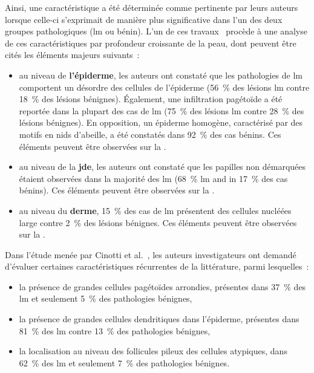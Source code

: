 Ainsi, une caractéristique a été déterminée comme pertinente par leurs auteurs lorsque celle-ci s'exprimait de manière plus significative dans l'un des deux groupes pathologiques (\gls{lm} ou bénin). L'un de ces travaux~\cite{Guitera2010} procède à une analyse de ces caractéristiques par profondeur croissante de la peau, dont peuvent être cités les éléments majeurs suivants~:
\begin{itemize}
    \item au niveau de \textbf{l'épiderme}, les auteurs ont constaté que les pathologies de \gls{lm} comportent un désordre des cellules de l'épiderme (56~\% des lésions \gls{lm} contre 18~\% des lésions bénignes). Également, une infiltration pagétoïde a été reportée dans la plupart des cas de \gls{lm} (75~\% des lésions \gls{lm} contre 28~\% des lésions bénignes). En opposition, un épiderme homogène, caractérisé par des motifs en nids d'abeille, a été constatés dans 92~\% des cas bénins. Ces éléments peuvent être observées sur la .
    \item au niveau de la \textbf{\gls{jde}}, les auteurs ont constaté que les papilles non démarquées étaient observées dans la majorité des \gls{lm} (68~\% \gls{lm} and in 17~\% des cas bénins). Ces éléments peuvent être observées sur la  .
    \item au niveau du \textbf{derme}, 15~\% des cas de \gls{lm} présentent des cellules nucléées large contre 2~\% des lésions bénignes. Ces éléments peuvent être observées sur la .
\end{itemize}\par

Dans l'étude menée par Cinotti et al.~\cite{Cinotti2018}, les auteurs investigateurs ont demandé d'évaluer certaines caractéristiques récurrentes de la littérature, parmi lesquelles~:
\begin{itemize}
    \item la présence de grandes cellules pagétoïdes arrondies, présentes dans 37~\% des \gls{lm} et seulement 5~\% des pathologies bénignes,
    \item la présence de grandes cellules dendritiques dans l'épiderme, présentes dans 81~\% des \gls{lm} contre 13~\% des pathologies bénignes,
    \item la localisation au niveau des follicules pileux des cellules atypiques, dans 62~\% des \gls{lm} et seulement 7~\% des pathologies bénignes.
\end{itemize}\par

